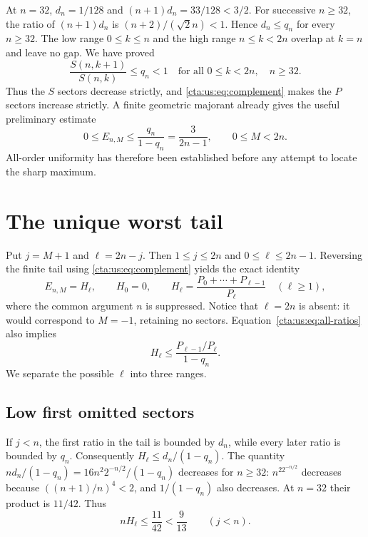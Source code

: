 \documentclass[11pt]{article}
\theoremstyle{definition}
\theoremstyle{remark}
\begin{document}
At $n=32$, $d_n=1/128$ and $(n+1)d_n=33/128<3/2$.
For successive $n\ge32$, the ratio of $(n+1)d_n$ is
$(n+2)/(\sqrt2 n)<1$. Hence $d_n\le q_n$ for every $n\ge32$.
The low range $0\le k\le n$ and the high range $n\le k<2n$
overlap at $k=n$ and leave no gap. We have proved
\begin{equation}\label{cta:us:eq:all-ratios}
 \frac{S(n,k+1)}{S(n,k)}\le q_n<1
 \quad\text{for all }0\le k<2n,\quad n\ge32.
\end{equation}
Thus the $S$ sectors decrease strictly, and \eqref{cta:us:eq:complement} makes
the $P$ sectors increase strictly. A finite geometric majorant already
gives the useful preliminary estimate
\begin{equation}\label{cta:us:eq:coarse}
 0\le E_{n,M}\le\frac{q_n}{1-q_n}=\frac3{2n-1},
 \qquad 0\le M<2n.
\end{equation}
All-order uniformity has therefore been established before any attempt
to locate the sharp maximum.

\section{The unique worst tail}\label{cta:us:sec:maximum}

Put $j=M+1$ and $\ell=2n-j$. Then $1\le j\le2n$ and
$0\le\ell\le2n-1$. Reversing the finite tail using
\eqref{cta:us:eq:complement} yields the exact identity
\begin{equation}\label{cta:us:eq:H}
 E_{n,M}=H_\ell,\qquad H_0=0,\qquad
 H_\ell=\frac{P_0+\cdots+P_{\ell-1}}{P_\ell}\quad(\ell\ge1),
\end{equation}
where the common argument $n$ is suppressed. Notice that $\ell=2n$
is absent: it would correspond to $M=-1$, retaining no sectors.
Equation~\eqref{cta:us:eq:all-ratios} also implies
\begin{equation}\label{cta:us:eq:Hgeometric}
 H_\ell\le\frac{P_{\ell-1}/P_\ell}{1-q_n}.
\end{equation}
We separate the possible $\ell$ into three ranges.

\subsection{Low first omitted sectors}
If $j<n$, the first ratio in the tail is bounded by $d_n$, while every
later ratio is bounded by $q_n$. Consequently
$H_\ell\le d_n/(1-q_n)$. The quantity
$nd_n/(1-q_n)=16n^2 2^{-n/2}/(1-q_n)$ decreases for $n\ge32$:
$n^22^{-n/2}$ decreases because $((n+1)/n)^4<2$, and
$1/(1-q_n)$ also decreases. At $n=32$ their product is $11/42$.
Thus
\begin{equation}\label{cta:us:eq:low-tail}
 nH_\ell\le\frac{11}{42}<\frac9{13}\qquad(j<n).
\end{equation}
\end{document}
